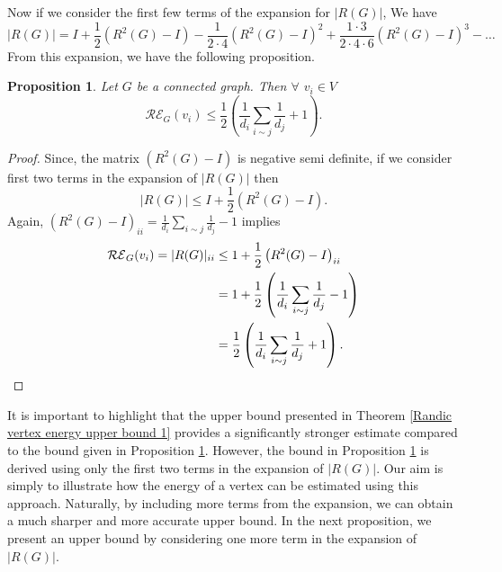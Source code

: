 \documentclass[10 pt]{article}
\newtheorem{proposition}{Proposition}[section]
\numberwithin{equation}{section}
\begin{document}
Now if we consider the first few terms of the expansion for $|R(G)|$, We have
$$|R(G)|=I+\frac{1}{2}\left(R^2(G)-I\right)-\frac{1}{2\cdot4}\left(R^2(G)-I\right)^2+\frac{1\cdot3}{2\cdot4\cdot6}\left(R^2(G)-I\right)^3-\ldots$$
From this expansion, we have the following proposition.
\begin{proposition}\label{Randic vertex energy upper bound 2}
Let $G$ be a connected graph. Then $\forall$ $v_i\in V$
$$\mathcal{RE}_G(v_i)\leq\frac{1}{2}\left(\frac{1}{d_i}\sum\limits_{i\sim j}\frac{1}{d_j}+1\right).$$
\end{proposition}
\begin{proof}
Since, the matrix $\left(R^2(G)-I\right)$ is negative semi definite, if we consider first two terms in the expansion of $|R(G)|$ then
$$|R(G)|\leq I+\frac{1}{2}\left(R^2(G)-I\right).$$
Again, $\left(R^2(G)-I\right)_{ii}=\frac{1}{d_i}\sum\limits_{i\sim j}\frac{1}{d_j}-1$ implies
\begin{align*}
\mathcal{RE}_G(v_i)=|R(G)|_{ii}&\leq 1+\frac{1}{2}\left(R^2(G)-I\right)_{ii}\\
&=1+\frac{1}{2}\left(\frac{1}{d_i}\sum\limits_{i\sim j}\frac{1}{d_j}-1\right)\\
&=\frac{1}{2}\left(\frac{1}{d_i}\sum\limits_{i\sim j}\frac{1}{d_j}+1\right).\qedhere
\end{align*}
\end{proof}
It is important to highlight that the upper bound presented in Theorem \ref{Randic vertex energy upper bound 1} provides a significantly stronger estimate compared to the bound given in Proposition \ref{Randic vertex energy upper bound 2}. However, the bound in Proposition \ref{Randic vertex energy upper bound 2} is derived using only the first two terms in the expansion of $|R(G)|$. Our aim is simply to illustrate how the energy of a vertex can be estimated using this approach. Naturally, by including more terms from the expansion, we can obtain a much sharper and more accurate upper bound. In the next proposition, we present an upper bound by considering one more term in the expansion of $|R(G)|$.
\end{document}

